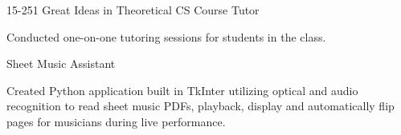 

\begin{cventries}

  \cventry
    {} %
    {15-251 Great Ideas in Theoretical CS Course Tutor} %
    {}%
    {} %
    {
      \begin{cvitems} %
        \item {Conducted one-on-one tutoring sessions for students in the class.}
      \end{cvitems}
    }

  \cventry
    {} %
    {Sheet Music Assistant} %
    {} %
    {} %
    {
      \begin{cvitems} %
        \item {Created Python application built in TkInter utilizing optical and audio recognition to read sheet music PDFs, playback, display and automatically flip pages for musicians during live performance.}
      \end{cvitems}
    }

\end{cventries}
